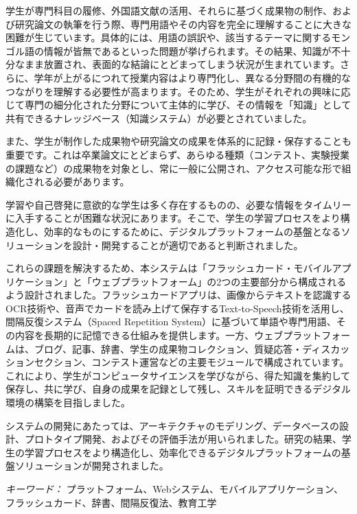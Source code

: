 \begin{japanese}

学生が専門科目の履修、外国語文献の活用、それらに基づく成果物の制作、および研究論文の執筆を行う際、専門用語やその内容を完全に理解することに大きな困難が生じています。具体的には、用語の誤訳や、該当するテーマに関するモンゴル語の情報が皆無であるといった問題が挙げられます。その結果、知識が不十分なまま放置され、表面的な結論にとどまってしまう状況が生まれています。さらに、学年が上がるにつれて授業内容はより専門化し、異なる分野間の有機的なつながりを理解する必要性が高まります。そのため、学生がそれぞれの興味に応じて専門の細分化された分野について主体的に学び、その情報を「知識」として共有できるナレッジベース（知識システム）が必要とされていました。

また、学生が制作した成果物や研究論文の成果を体系的に記録・保存することも重要です。これは卒業論文にとどまらず、あらゆる種類（コンテスト、実験授業の課題など）の成果物を対象とし、常に一般に公開され、アクセス可能な形で組織化される必要があります。

学習や自己啓発に意欲的な学生は多く存在するものの、必要な情報をタイムリーに入手することが困難な状況にあります。そこで、学生の学習プロセスをより構造化し、効率的なものにするために、デジタルプラットフォームの基盤となるソリューションを設計・開発することが適切であると判断されました。

これらの課題を解決するため、本システムは「フラッシュカード・モバイルアプリケーション」と「ウェブプラットフォーム」の2つの主要部分から構成されるよう設計されました。フラッシュカードアプリは、画像からテキストを認識するOCR技術や、音声でカードを読み上げて保存するText-to-Speech技術を活用し、間隔反復システム（Spaced Repetition System）に基づいて単語や専門用語、その内容を長期的に記憶できる仕組みを提供します。一方、ウェブプラットフォームは、ブログ、記事、辞書、学生の成果物コレクション、質疑応答・ディスカッションセクション、コンテスト運営などの主要モジュールで構成されています。これにより、学生がコンピュータサイエンスを学びながら、得た知識を集約して保存し、共に学び、自身の成果を記録として残し、スキルを証明できるデジタル環境の構築を目指しました。

システムの開発にあたっては、アーキテクチャのモデリング、データベースの設計、プロトタイプ開発、およびその評価手法が用いられました。研究の結果、学生の学習プロセスをより構造化し、効率化できるデジタルプラットフォームの基盤ソリューションが開発されました。

\vspace{3mm}
\textit{キーワード：} プラットフォーム、Webシステム、モバイルアプリケーション、フラッシュカード、辞書、間隔反復法、教育工学
\end{japanese}

